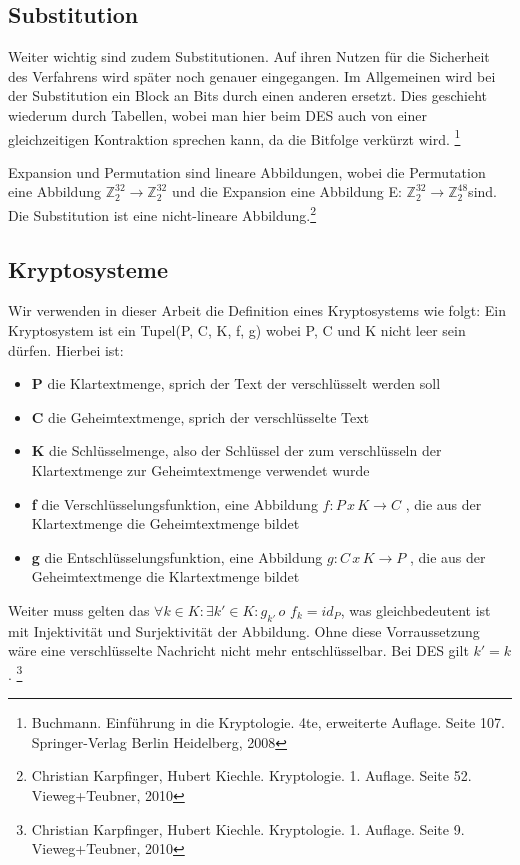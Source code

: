 \documentclass[
10pt, %
a4paper, %
oneside, %
headinclude,footinclude, %
BCOR5mm, %
]{scrartcl}
\begin{document}
\subsection{Substitution}
Weiter wichtig sind zudem Substitutionen. Auf ihren Nutzen für die Sicherheit des Verfahrens wird später noch genauer eingegangen. Im Allgemeinen wird bei der Substitution ein Block an Bits durch einen anderen ersetzt. Dies geschieht wiederum durch Tabellen, wobei man hier beim DES auch von einer gleichzeitigen Kontraktion sprechen kann, da die Bitfolge verkürzt wird.
 \footnote{Buchmann. Einführung in die Kryptologie. 4te, erweiterte Auflage. Seite 107. Springer-Verlag Berlin Heidelberg, 2008} 

Expansion und Permutation sind lineare Abbildungen, wobei die Permutation eine Abbildung $\mathbb{Z}^{32}_2 \rightarrow \mathbb{Z}^{32}_2 $ und die Expansion eine Abbildung E: $ \mathbb{Z}^{32}_2 \rightarrow \mathbb{Z}^{48}_2 $sind.
Die Substitution ist eine nicht-lineare Abbildung.\footnote{Christian Karpfinger, Hubert Kiechle. Kryptologie. 1. Auflage. Seite 52. Vieweg+Teubner, 2010} 
\subsection{Kryptosysteme}
Wir verwenden in dieser Arbeit die Definition eines Kryptosystems wie folgt: 
Ein Kryptosystem ist ein Tupel(P, C, K, f, g) wobei P, C und K nicht leer sein dürfen. Hierbei ist: 
\begin{itemize} 
\item \textbf{P} die Klartextmenge, sprich der Text der verschlüsselt werden soll
\item \textbf{C} die Geheimtextmenge, sprich der verschlüsselte Text
\item \textbf{K} die Schlüsselmenge, also der Schlüssel der zum verschlüsseln der Klartextmenge zur Geheimtextmenge verwendet wurde
\item \textbf{f} die Verschlüsselungsfunktion, eine Abbildung $f: P \, x\,  K \rightarrow C$ , die aus der Klartextmenge die Geheimtextmenge bildet
\item \textbf{g} die Entschlüsselungsfunktion, eine Abbildung $g: C \, x \, K \rightarrow P$ , die aus der Geheimtextmenge die Klartextmenge bildet
\end{itemize}

Weiter muss gelten das $\forall k \in K : \exists k' \in K : g_{k'} \, o $ $ f_k = id_P $, was gleichbedeutent ist mit Injektivität und Surjektivität der Abbildung. Ohne diese Vorraussetzung wäre eine verschlüsselte Nachricht nicht mehr entschlüsselbar. Bei DES gilt $k' = k$. \footnote{Christian Karpfinger, Hubert Kiechle. Kryptologie. 1. Auflage. Seite 9. Vieweg+Teubner, 2010}
\end{document}
